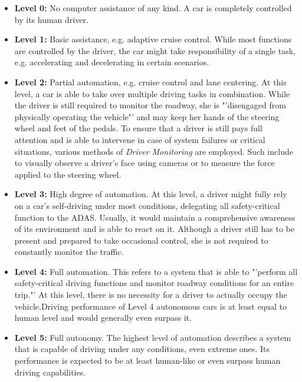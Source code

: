 \begin{samepage}
\begin{itemize}
	\item \textbf{Level 0:} No computer assistance of any kind. A car is completely controlled by its human driver.
	\item \textbf{Level 1:} Basic assistance, e.g. adaptive cruise control. While most functions are controlled by the driver, the car might take responsibility of a single task, e.g. accelerating and decelerating in certain scenarios.
	\item \textbf{Level 2:} Partial automation, e.g. cruise control and lane centering. At this level, a car is able to take over multiple driving tasks in combination. While the driver is still required to monitor the roadway, she is "'disengaged from physically operating the vehicle"' \cite{Klein} and may keep her hands of the steering wheel and feet of the pedals. To ensure that a driver is still pays full attention and is able to intervene in case of system failures or critical situations, various methods of \textit{Driver Monitoring} are employed. Such include to visually observe a driver's face using cameras or to measure the force applied to the steering wheel.
	\item \textbf{Level 3:} High degree of automation. At this level, a driver might fully rely on a car's self-driving under most conditions, delegating all safety-critical function to the ADAS. Usually, it would maintain a comprehensive awareness of its environment and is able to react on it. Although a driver still has to be present and prepared to take occasional control, she is not required to constantly monitor the traffic. 
	\item \textbf{Level 4:} Full automation. This refers to a system that is able to "'perform all safety-critical driving functions and monitor roadway conditions for an entire trip."' \cite{2016transportation} At this level, there is no necessity for a driver to actually occupy the vehicle.Driving performance of Level 4 autonomous cars is at least equal to human level and would generally even surpass it. 
	\item \textbf{Level 5:} Full autonomy. The highest level of automation describes a system that is capable of driving under any conditions, even extreme ones. Its performance is expected to be at least human-like or even surpass human driving capabilities. 
\end{itemize}
\end{samepage}


